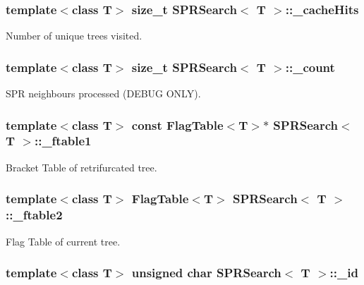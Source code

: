 \subsubsection{\setlength{\rightskip}{0pt plus 5cm}template$<$class T$>$ size\_\-t {\bf SPRSearch}$<$ T $>$::{\bf \_\-cache\-Hits}}\label{classSPRSearch_o3}


Number of unique trees visited. 

\subsubsection{\setlength{\rightskip}{0pt plus 5cm}template$<$class T$>$ size\_\-t {\bf SPRSearch}$<$ T $>$::{\bf \_\-count}}\label{classSPRSearch_o2}


SPR neighbours processed (DEBUG ONLY). 

\subsubsection{\setlength{\rightskip}{0pt plus 5cm}template$<$class T$>$ const {\bf Flag\-Table}$<$T$>$$\ast$ {\bf SPRSearch}$<$ T $>$::{\bf \_\-ftable1}\hspace{0.3cm}{\tt  [protected]}}\label{classSPRSearch_p13}


Bracket Table of retrifurcated tree. 

\subsubsection{\setlength{\rightskip}{0pt plus 5cm}template$<$class T$>$ {\bf Flag\-Table}$<$T$>$ {\bf SPRSearch}$<$ T $>$::{\bf \_\-ftable2}\hspace{0.3cm}{\tt  [protected]}}\label{classSPRSearch_p14}


Flag Table of current tree. 

\subsubsection{\setlength{\rightskip}{0pt plus 5cm}template$<$class T$>$ unsigned char {\bf SPRSearch}$<$ T $>$::{\bf \_\-id}\hspace{0.3cm}{\tt  [protected]}}\label{classSPRSearch_p19}


